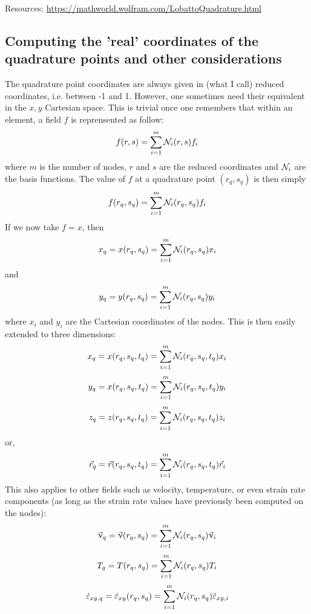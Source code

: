 Resources: \url{https://mathworld.wolfram.com/LobattoQuadrature.html}

 
\subsection{Computing the 'real' coordinates of the quadrature points and other considerations}

The quadrature point coordinates are always given in (what I call) reduced coordinates, i.e. between 
-1 and 1.
However, one sometimes need their equivalent in the $x,y$ Cartesian space. 
This is trivial once one remembers that within an element, a field $f$ is reprensented 
as follow:
\[
f(r,s) = \sum_{i=1}^{m} {\mathcal{N}}_{i}(r,s) f_i
\]
where $m$ is the number of nodes, $r$ and $s$ are the reduced coordinates 
and ${\mathcal{N}}_i$ are the basis functions. 
The value of $f$ at a quadrature point $(r_q,s_q)$ is then simply
\[
f(r_q,s_q) = \sum_{i=1}^{m} {\mathcal{N}}_{i}(r_q,s_q) f_i
\]
If we now take $f=x$, then
\[
x_q =x(r_q,s_q) = \sum_{i=1}^{m} {\mathcal{N}}_{i}(r_q,s_q) x_i
\]
and
\[
y_q =y(r_q,s_q) = \sum_{i=1}^{m} {\mathcal{N}}_{i}(r_q,s_q) y_i
\]
where $x_i$ and $y_i$ are the Cartesian coordinates of the nodes.
This is then easily extended to three dimensions:
\[
x_q =x(r_q,s_q,t_q) = \sum_{i=1}^{m} {\mathcal{N}}_{i}(r_q,s_q,t_q) x_i
\]
\[
y_q =x(r_q,s_q,t_q) = \sum_{i=1}^{m} {\mathcal{N}}_{i}(r_q,s_q,t_q) y_i
\]
\[
z_q =z(r_q,s_q,t_q) = \sum_{i=1}^{m} {\mathcal{N}}_{i}(r_q,s_q,t_q) z_i
\]
or, 
\[
\vec{r}_q =\vec{r}(r_q,s_q,t_q) = \sum_{i=1}^{m} {\mathcal{N}}_{i}(r_q,s_q,t_q) \vec{r}_i
\]
This also applies to other fields such as velocity, temperature, or even strain rate components 
(as long as the strain rate values have previously been computed on the nodes): 
\[
\vec{\upnu}_q =\vec{\upnu}(r_q,s_q) = \sum_{i=1}^{m} {\mathcal{N}}_{i}(r_q,s_q) \vec{\upnu}_i
\]
\[
T_q =T(r_q,s_q) = \sum_{i=1}^{m} {\mathcal{N}}_{i}(r_q,s_q) T_i
\]
\[
\dot{\varepsilon}_{xy,q} 
= \dot{\varepsilon}_{xy} (r_q,s_q) = \sum_{i=1}^{m} {\mathcal{N}}_{i}(r_q,s_q)  \dot{\varepsilon}_{xy,i}
\]













